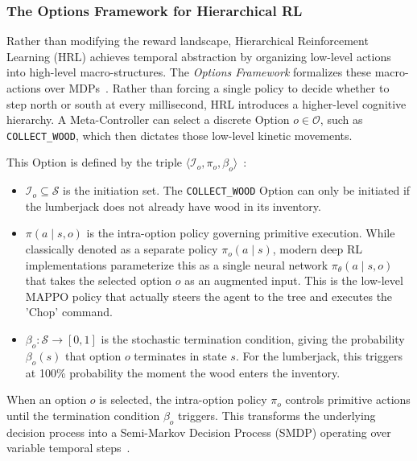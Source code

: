 \subsubsection{The Options Framework for Hierarchical RL}
\label{subsec:options_framework}

Rather than modifying the reward landscape, Hierarchical Reinforcement Learning (HRL) achieves temporal abstraction by organizing low-level actions into high-level macro-structures. The \emph{Options Framework} formalizes these macro-actions over MDPs~\parencite{Sutton_Precup_Singh_1999}. Rather than forcing a single policy to decide whether to step north or south at every millisecond, HRL introduces a higher-level cognitive hierarchy. A Meta-Controller can select a discrete Option $o \in \mathcal{O}$, such as \texttt{COLLECT\_WOOD}, which then dictates those low-level kinetic movements.

This Option is defined by the triple $\langle \mathcal{I}_o, \pi_o, \beta_o \rangle$~\parencite{Sutton_Precup_Singh_1999}:
\begin{itemize}
    \item $\mathcal{I}_o \subseteq \mathcal{S}$ is the initiation set. The \texttt{COLLECT\_WOOD} Option can only be initiated if the lumberjack does not already have wood in its inventory.
    \item $\pi(a \mid s, o)$ is the intra-option policy governing primitive execution. While classically denoted as a separate policy $\pi_o(a \mid s)$, modern deep RL implementations parameterize this as a single neural network $\pi_\theta(a \mid s, o)$ that takes the selected option $o$ as an augmented input. This is the low-level MAPPO policy that actually steers the agent to the tree and executes the 'Chop' command.
    \item $\beta_o: \mathcal{S} \rightarrow [0, 1]$ is the stochastic termination condition, giving the probability $\beta_o(s)$ that option $o$ terminates in state $s$. For the lumberjack, this triggers at 100\% probability the moment the wood enters the inventory.
\end{itemize}

When an option $o$ is selected, the intra-option policy $\pi_o$ controls primitive actions until the termination condition $\beta_o$ triggers. This transforms the underlying decision process into a Semi-Markov Decision Process (SMDP) operating over variable temporal steps~\parencite{Sutton_Precup_Singh_1999}.

